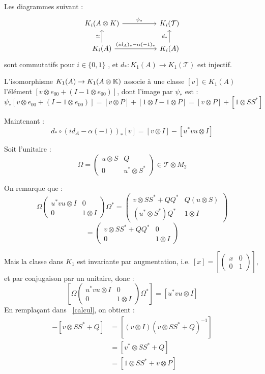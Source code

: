 \begin{lem}\label{diagramme}
Les diagrammes suivant :
\[\begin{tikzcd}[column sep = huge]
K_i(A\otimes K) \arrow{r}{\psi_*}& K_i(\mathcal T) \\
K_i(A)   \arrow{u}{\simeq}\arrow{r}{(id_A)_*-\alpha(-1)_*}& K_i(A) \arrow{u}{d_*}
\end{tikzcd}
\]
sont commutatifs pour $i\in\{0,1\}$ , et $d_* : K_1(A)\rightarrow K_1(\mathcal T)$ est injectif.
\end{lem}

\begin{dem}
L'isomorphisme $K_1(A)\rightarrow K_1(A\otimes\mathbb K)$ associe à une classe $[v]\in K_1(A)$ l'élément $[v\otimes e_{00}+(I-1\otimes e_{00})]$, dont l'image par $\psi_*$ est :
\begin{equation}\label{identite}\psi_*[v\otimes e_{00}+(I-1\otimes e_{00})]= [v\otimes P]+[1\otimes I-1\otimes P] = [v\otimes P]+[1\otimes SS^*]\end{equation}

Maintenant :
\begin{equation}\label{calcul}d_*\circ \left(id_A-\alpha(-1)\right)_*[v]= [ v\otimes I]-[ u^*vu\otimes I]\end{equation}

Soit l'unitaire :\quad\[\Omega = \begin{pmatrix}u\otimes S & Q \\ 0 & u^*\otimes S^*\end{pmatrix}\in \mathcal T \otimes M_2\]

On remarque que :
\[\Omega\begin{pmatrix}u^*vu\otimes I & 0 \\ 0 & 1\otimes I\end{pmatrix}\Omega^*= \begin{pmatrix}v\otimes SS^* +QQ^*& Q(u\otimes S) \\ (u^*\otimes S^*)Q^* & 1\otimes I\end{pmatrix}\]
\[=\begin{pmatrix}v\otimes SS^* +QQ^*& 0 \\ 0 & 1\otimes I\end{pmatrix}\]


Mais la classe dans $K_1$ est invariante par augmentation, i.e. $[x]=\left[\begin{pmatrix}x& 0 \\ 0 & 1\end{pmatrix}\right]$, et par conjugaison par un unitaire, donc :
\[\left[\Omega\begin{pmatrix}u^*vu\otimes I & 0 \\ 0 & 1\otimes I\end{pmatrix}\Omega^*\right]=\left[u^*vu\otimes I\right]\]
En remplaçant dans ~\eqref{calcul}, on obtient :
\begin{align*}
[ v\otimes I]-[v\otimes SS^* +Q]& =[( v\otimes I)(v\otimes SS^* +Q)^{-1}]\\\
&=[v^*\otimes SS^* +Q]\\
&=[1\otimes SS^* +v\otimes P]
\end{align*}


\end{dem}
